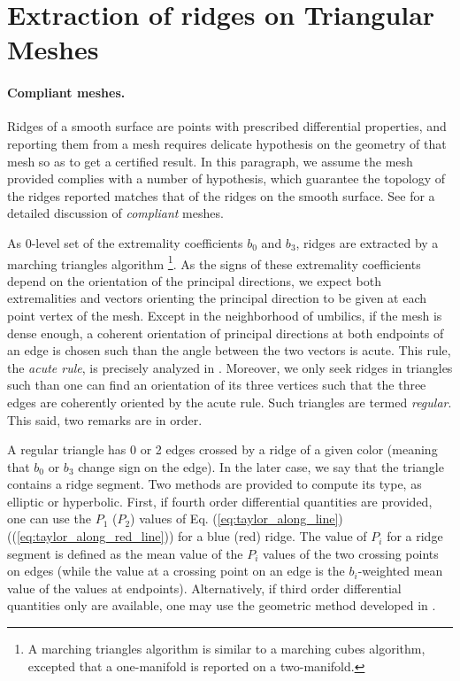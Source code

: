 \section{Extraction of ridges on Triangular Meshes}
\label{ridge-mesh}

\paragraph{Compliant meshes.}
Ridges of a smooth surface are points with prescribed differential
properties, and reporting them from a mesh requires delicate
hypothesis on the geometry of that mesh so as to get a certified
result. In this paragraph, we assume the mesh provided complies with a
number of hypothesis, which guarantee the topology of the ridges
reported matches that of the ridges on the smooth surface. See
\cite{cgal:cp-tdare-05} for a detailed discussion of {\em compliant} meshes.
\medskip

As 0-level set of the extremality coefficients $b_0$ and $b_3$, ridges
are extracted by a marching triangles algorithm \footnote{A marching
triangles algorithm is similar to a marching cubes algorithm, excepted
that a one-manifold is reported on a two-manifold.}.
As the signs of these extremality coefficients depend on the
orientation of the principal directions, we expect both extremalities
and vectors orienting the principal direction to be given at each
point vertex of the mesh. Except in the neighborhood of umbilics, if
the mesh is dense enough, a coherent orientation of principal
directions at both endpoints of an edge is chosen such than the angle
between the two vectors is acute. This rule, the {\em acute rule}, is
precisely analyzed in \cite{cgal:cp-tdare-05}.
Moreover, we only seek ridges in triangles such than one can find an
orientation of its three vertices such that the three edges are
coherently oriented by the acute rule. Such triangles are termed
{\em regular}. This said, two remarks are in order.

A regular triangle has 0 or 2 edges crossed by a ridge of a given
color (meaning that $b_0$ or $b_3$ change sign on the edge). In the
later case, we say that the triangle contains a ridge segment.
Two methods are provided to compute its type, as elliptic or
hyperbolic. First, if fourth order differential quantities are
provided, one can use the $P_1$ ($P_2$) values of Eq.
(\ref{eq:taylor_along_line}) ((\ref{eq:taylor_along_red_line})) for
a blue (red) ridge. The value of $P_i$ for a ridge segment is defined
as the mean value of the $P_i$ values of the two crossing points on
edges (while the value at a crossing point on an edge is the
$b_i$-weighted mean value of the values at endpoints).
Alternatively, if third order differential quantities only are
available, one may use the geometric method developed in
\cite{cgal:cp-tdare-05}.


